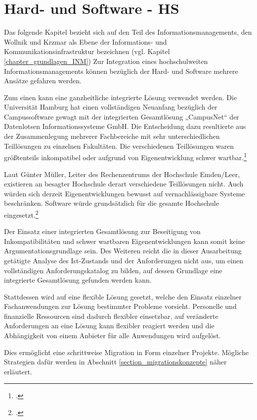 \section{Hard- und Software - HS}

Das folgende Kapitel bezieht sich auf den Teil des Informationsmanagements, den 
Wollnik und Krzmar als Ebene der Informations- und Kommunikationsinfrastruktur 
bezeichnen (vgl. Kapitel \ref{chapter_grundlagen_INM}) Zur Integration eines hochschulweiten 
Informationsmanagements können bezüglich der Hard- und Software mehrere Ansätze 
gefahren werden.

Zum einen kann eine ganzheitliche integrierte Lösung verwendet werden. Die Universität 
Hamburg hat einen vollständigen Neuanfang bezüglich der Campussoftware gewagt mit 
der integrierten Gesamtlösung „CampusNet“ der Datenlotsen Informationssysteme GmbH. 
Die Entscheidung dazu resultierte aus der Zusammenlegung mehrerer Fachbereiche mit 
sehr unterschiedlichen Teillösungen zu einzelnen Fakultäten. Die verschiedenen Teillösungen 
waren größtenteils inkompatibel oder aufgrund von Eigenentwicklung schwer 
wartbar.\footcite[Vgl.][38]{dini_webportale_2007}

Laut Günter Müller, Leiter des Rechenzentrums der Hochschule Emden/Leer, existieren 
an besagter Hochschule derart verschiedene Teillösungen nicht. Auch würden sich derzeit
Eigenentwicklungen bewusst auf vernachlässigbare Systeme beschränken. 
Software würde grundsätzlich für die gesamte Hochschule 
eingesetzt.\footcite{gunter_muller_interview}

Der Einsatz einer integrierten Gesamtlösung zur Beseitigung von Inkompatibilitäten und 
schwer wartbaren Eigenentwicklungen kann somit keine Argumentationsgrundlage sein.
Des Weiteren reicht die in dieser Ausarbeitung getätigte Analyse des Ist-Zustands und 
der Anforderungen nicht aus, um einen vollständigen Anforderungskatalog zu bilden, 
auf dessen Grundlage eine integrierte Gesamtlösung gefunden werden kann.

Stattdessen wird auf eine flexible Lösung gesetzt, welche den Einsatz einzelner 
Fachanwendungen zur Lösung bestimmter Probleme vorsieht. Personelle und 
finanzielle Ressourcen sind dadurch flexibler einsetzbar, auf veränderte Anforderungen 
an eine Lösung kann flexibler reagiert werden und die Abhängigkeit von einem 
Anbieter für alle Anwendungen wird aufgelöst.

Dies ermöglicht eine schrittweise Migration in Form einzelner Projekte. 
Mögliche Strategien dafür werden in Abschnitt \ref{section_migrationskonzepte} näher erläutert. 

